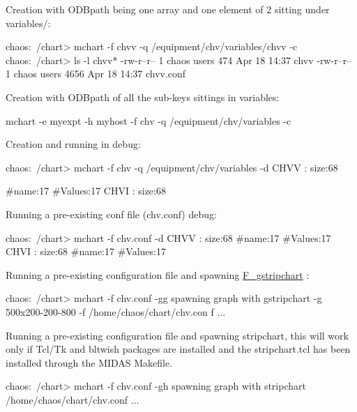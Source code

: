 \begin{DoxyItemize}
\item Creation with ODBpath being one array and one element of 2 sitting under variables/: 
\begin{DoxyCode}
  chaos:~/chart> mchart -f chvv -q /equipment/chv/variables/chvv -c
  chaos:~/chart> ls -l chvv*
  -rw-r--r--   1 chaos    users         474 Apr 18 14:37 chvv
  -rw-r--r--   1 chaos    users        4656 Apr 18 14:37 chvv.conf
\end{DoxyCode}

\item Creation with ODBpath of all the sub-\/keys sittings in variables: 
\begin{DoxyCode}
  mchart -e myexpt -h myhost -f chv -q /equipment/chv/variables -c
\end{DoxyCode}

\item Creation and running in debug: 
\begin{DoxyCode}
  chaos:~/chart> mchart -f chv -q /equipment/chv/variables -d
  CHVV : size:68

  #name:17 #Values:17
  CHVI : size:68
\end{DoxyCode}

\item Running a pre-\/existing conf file (chv.conf) debug: 
\begin{DoxyCode}
  chaos:~/chart> mchart -f chv.conf -d
  CHVV : size:68
  #name:17 #Values:17
  CHVI : size:68
  #name:17 #Values:17
\end{DoxyCode}

\item Running a pre-\/existing configuration file and spawning \hyperlink{F_LogUtil_F_gstripchart}{F\_\-gstripchart} : 
\begin{DoxyCode}
  chaos:~/chart> mchart -f chv.conf -gg
  spawning graph with gstripchart -g 500x200-200-800 -f /home/chaos/chart/chv.con
      f ...
\end{DoxyCode}

\end{DoxyItemize}


\begin{DoxyItemize}
\item Running a pre-\/existing configuration file and spawning stripchart, this will work only if Tcl/Tk and bltwish packages are installed and the stripchart.tcl has been installed through the MIDAS Makefile. 
\begin{DoxyCode}
  chaos:~/chart> mchart -f chv.conf -gh
  spawning graph with stripchart /home/chaos/chart/chv.conf ...
\end{DoxyCode}

\end{DoxyItemize}

